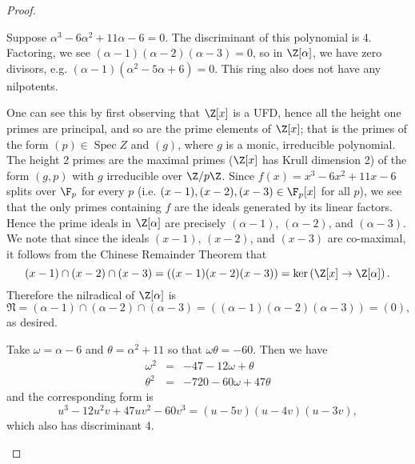 \documentclass[10pt]{amsart}
\begin{document}
\begin{thm}
\begin{proof}
\begin{enumerate}[(a)]
\begin{enumerate}[(i)]
        Suppose $\alpha^3 - 6\alpha^2 + 11\alpha - 6 = 0$.
        The discriminant of this polynomial is 4.
        Factoring, we see $(\alpha - 1)(\alpha - 2)(\alpha - 3) = 0$, so in $\Z[\alpha]$, we have zero divisors, e.g. $(\alpha - 1)(\alpha^2 - 5\alpha + 6) = 0$.
        This ring also does not have any nilpotents.
        
        One can see this by first observing that $\Z[x]$ is a UFD, hence all the height one primes are principal, and so are the prime elements of $\Z[x]$; that is the primes of the form $(p) \in \operatorname{Spec}Z$ and $(g)$, where $g$ is a monic, irreducible polynomial.
        The height 2 primes are the maximal primes ($\Z[x]$ has Krull dimension 2) of the form $(g, p)$ with $g$ irreducible over $\Z/p\Z$.
        Since $f(x) = x^3 - 6x^2 + 11x - 6$ splits over $\F_p$ for every $p$ (i.e. $(x - 1), (x - 2), (x - 3) \in \F_p[x]$ for all $p$), we see that the only primes containing $f$ are the ideals generated by its linear factors.
        Hence the prime ideals in $\Z[\alpha]$ are precisely $(\alpha - 1)$, $(\alpha - 2)$, and $(\alpha - 3)$.
        We note that since the ideals $(x - 1)$, $(x - 2)$, and $(x - 3)$ are co-maximal, it follows from the Chinese Remainder Theorem that
        $$(x - 1) \cap (x - 2) \cap (x - 3) = \left((x - 1)(x - 2)(x - 3)\right) = \ker\left(\Z[x] \rightarrow \Z[\alpha]\right).$$
        Therefore the nilradical of $\Z[\alpha]$ is 
        $$\mathfrak{N} = (\alpha - 1) \cap (\alpha - 2) \cap (\alpha - 3) = \left((\alpha - 1)(\alpha - 2)(\alpha - 3)\right) = (0),$$
        as desired.
        
        Take $\omega = \alpha - 6$ and $\theta = \alpha^2 + 11$ so that $\omega\theta = -60$.
        Then we have
        \begin{eqnarray*}
          \omega^2 &=& -47 - 12\omega + \theta\\
          \theta^2 &=& -720 -60\omega + 47\theta
        \end{eqnarray*}
        and the corresponding form is
        $$u^3 - 12u^2v + 47uv^2 - 60v^3 = (u - 5v)(u - 4v)(u - 3v),$$
        which also has discriminant 4.
      \end{enumerate}
    \end{enumerate}
  \end{proof}
\end{thm}
\end{document}
